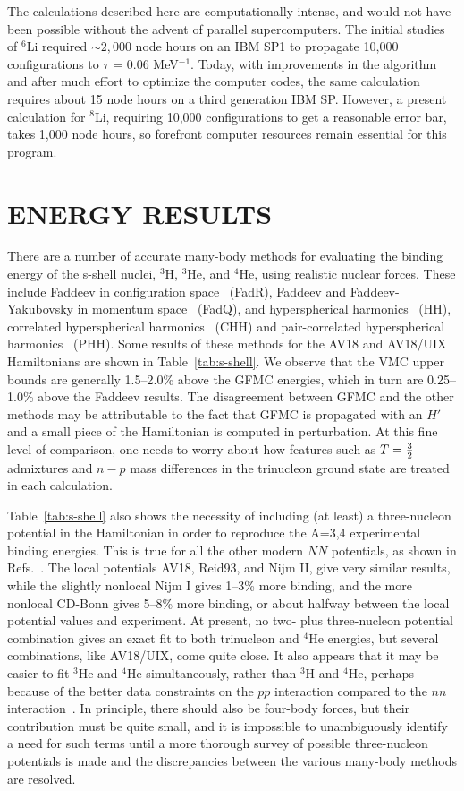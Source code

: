 The calculations described here are computationally intense, and would not
have been possible without the advent of parallel supercomputers.
The initial studies~\cite{PPCW95} of $^6$Li required $\sim 2,000$ node hours
on an IBM SP1 to propagate 10,000 configurations to $\tau$ = 0.06 MeV$^{-1}$.
Today, with improvements in the algorithm and after much effort to optimize
the computer codes, the same calculation requires about 15 node hours on a
third generation IBM SP.
However, a present calculation for $^8$Li, requiring 10,000 configurations
to get a reasonable error bar, takes 1,000 node hours, so forefront
computer resources remain essential for this program.

\section{ENERGY RESULTS}

There are a number of accurate many-body methods for evaluating the binding
energy of the s-shell nuclei, $^3$H, $^3$He, and $^4$He, using realistic nuclear
forces.  These include Faddeev in configuration space~\cite{FPSS93} (FadR), 
Faddeev and Faddeev-Yakubovsky in momentum space~\cite{NKG00} (FadQ), 
and hyperspherical harmonics~\cite{HH} (HH), 
correlated hyperspherical harmonics~\cite{VKR95} (CHH)
and pair-correlated hyperspherical harmonics~\cite{KVR93} (PHH).
Some results of these methods for the AV18 and AV18/UIX Hamiltonians 
are shown in Table~\ref{tab:s-shell}.
We observe that the VMC upper bounds are generally 1.5--2.0\% above the GFMC
energies, which in turn are 0.25--1.0\% above the Faddeev results.
The disagreement between GFMC and the other methods may
be attributable to the fact that GFMC is propagated with an $H'$ and a
small piece of the Hamiltonian is computed in perturbation.
At this fine level of comparison, one needs to worry about how features such
as $T=\textstyle{3\over2}$ admixtures and $n-p$ mass differences in the trinucleon
ground state are treated in each calculation.

Table~\ref{tab:s-shell} also shows the necessity of including (at least) a 
three-nucleon potential in the Hamiltonian in order to reproduce the A=3,4 
experimental binding energies.
This is true for all the other modern $N\!N$ potentials, as shown in 
Refs.~\cite{FPSS93,NKG00}.
The local potentials AV18, Reid93, and Nijm II, give very similar results, 
while the slightly nonlocal Nijm I gives 1--3\% more binding, and the
more nonlocal CD-Bonn gives 5--8\% more binding, or about halfway between
the local potential values and experiment.
At present, no two- plus three-nucleon potential combination gives an
exact fit to both trinucleon and $^4$He energies, but several combinations, 
like AV18/UIX, come quite close.
It also appears that it may be easier to fit $^3$He and $^4$He simultaneously,
rather than $^3$H and $^4$He, perhaps because of the better data constraints
on the $pp$ interaction compared to the $nn$ interaction~\cite{NKG00}.
In principle, there should also be four-body forces, but their contribution
must be quite small, and it is impossible to unambiguously identify a need 
for such terms until a more thorough survey of possible three-nucleon
potentials is made and the discrepancies between the various many-body 
methods are resolved.

